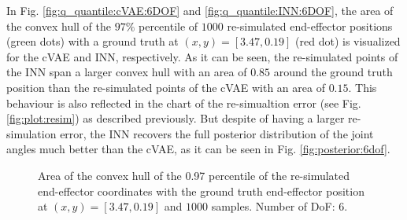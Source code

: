 \documentclass[conference]{IEEEtran}
\begin{document}
In Fig. \ref{fig:q_quantile:cVAE:6DOF} and \ref{fig:q_quantile:INN:6DOF}, the area of the convex hull of the $97\%$ percentile of $1000$ re-simulated end-effector positions (green dots) with a ground truth at $(x, y) = [3.47, 0.19]$ (red dot) is visualized for the cVAE and INN, respectively.  As it can be seen, the re-simulated points of the INN span a larger convex hull with an area of $0.85$ around the ground truth position than the re-simulated points of the cVAE with an area of $0.15$. This behaviour is also reflected in the chart of the re-simualtion error (see Fig. \ref{fig:plot:resim}) as described previously. But despite of having a larger re-simulation error, the INN recovers the full posterior distribution of the joint angles much better than the cVAE, as it can be seen in Fig. \ref{fig:posterior:6dof}. 

\begin{figure}[tbh]
\centering

    \caption{Area of the convex hull of the 0.97 percentile of the re-simulated end-effector coordinates with the ground truth end-effector position at $(x, y) = [3.47, 0.19]$ and $1000$ samples. Number of DoF: 6.}
\end{figure}
\end{document}
